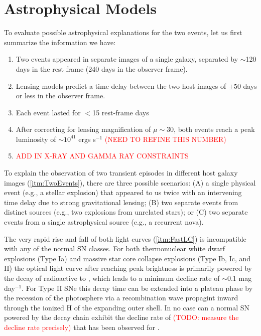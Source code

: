 \section{Astrophysical Models}

To evaluate possible astrophysical explanations for the two \spock
events, let us first summarize the information we have:

\begin{enumerate}
\item{Two events appeared in separate images of a single galaxy,
  separated by $\sim$120 days in the rest frame (240 days in the
  observer frame). \label{itm:TwoEvents}}
\item{Lensing models predict a time delay between the two host images
  of $\pm50$ days or less in the observer frame.}
\item{Each event lasted for $<$15 rest-frame days\label{itm:FastLC}}
\item{After correcting for lensing magnification of $\mu\sim30$, both
  events reach a peak luminosity of $\sim10^{41}$ ergs s$^{-1}$
  \textcolor{red}{(NEED TO REFINE THIS NUMBER)}}
\item{\textcolor{red}{ADD IN X-RAY AND GAMMA RAY CONSTRAINTS}}
\end{enumerate}

To explain the observation of two transient episodes in different host
galaxy images (\ref{itm:TwoEvents}), there are three possible
scenarios: (A) a single physical event (e.g., a stellar explosion)
that appeared to us twice with an intervening time delay due to strong
gravitational lensing; (B) two separate events from distinct sources
(e.g., two explosions from unrelated stars); or (C) two separate
events from a single astrophysical source (e.g., a recurrent nova).

The very rapid rise and fall of both light curves (\ref{itm:FastLC})
is incompatible with any of the normal SN classes.  For both
thermonuclear white dwarf explosions (Type Ia) and massive star core
collapse explosions (Type Ib, Ic, and II) the optical light curve
after reaching peak brightness is primarily powered by the decay of
radioactive \NiFiftySix to \CoFiftySix, which leads to a minimum
decline rate of $\sim$0.1 mag day$^{-1}$.  For Type II SNe this decay
time can be extended into a plateau phase by the recession of the
photosphere via a recombination wave propagint inward through the
ionized H of the expanding outer shell.  In no case can a normal SN
powered by the \NiFiftySix decay chain exhibit the decline rate of
\textcolor{red}{(TODO: measure the decline rate precisely)} that has
been observed for \spock.

